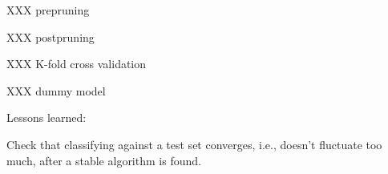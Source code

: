 XXX prepruning

XXX postpruning

XXX K-fold cross validation

XXX dummy model

Lessons learned:

Check that classifying against a test set converges, i.e., doesn't
fluctuate too much, after a stable algorithm is found.
